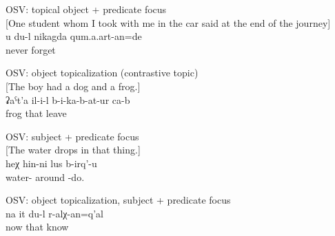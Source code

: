 %
\begin{exe}
	\ex	OSV: topical object + predicate focus\\\label{ex:I will never forget you OSV}%
		[One student whom I took with me in the car said at the end of the journey]\\
	\gll	u	du-l	nikagda	qum.a.art-an=de\\
				never	forget\\
	\glt	{}

	\ex	OSV: object topicalization (contrastive topic)\\\label{ex:The frog he put into a can OSV}%
		[The boy had a dog and a frog.]\\
	\gll	ʡaˁt'a	il-i-l	b-i-ka-b-at-ur	ca-b\\
		frog	that	leave	\\
	\glt	{}

\ex	OSV: subject + predicate focus\\\label{The water spins it around.}%
		[The water drops in that thing.]\\
	\gll	heχ	hin-ni	lus	b-irq'-u\\
		 water- around -do.\\
	\glt	{}
	
	\ex	OSV: object topicalization, subject + predicate focus\\	\label{ex:Well, I know her; [that Salikhat who married Rasul}
	\gll	na	it	du-l	r-alχ-an=q'al\\
		now	that		know\\
	\glt	{}
\end{exe}

